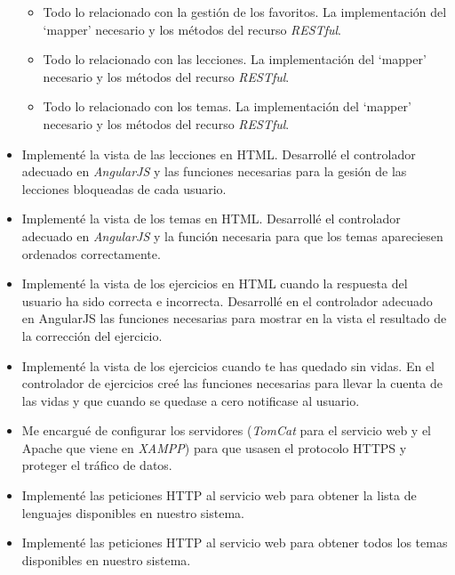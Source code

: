 \begin{itemize}
\begin{itemize}
\item
Todo lo relacionado con la gestión de los favoritos. La implementación del `mapper' necesario y los métodos del recurso \textit{RESTful}.

\item
Todo lo relacionado con las lecciones. La implementación del `mapper' necesario y los métodos del recurso \textit{RESTful}.

\item
Todo lo relacionado con los temas. La implementación del `mapper' necesario y los métodos del recurso \textit{RESTful}.
\end{itemize}
    
\item
Implementé la vista de las lecciones en HTML. Desarrollé el controlador adecuado en \textit{AngularJS} y las funciones necesarias para la gesión de las lecciones bloqueadas de cada usuario.

\item
Implementé la vista de los temas en HTML. Desarrollé el controlador adecuado en \textit{AngularJS} y la función necesaria para que los temas apareciesen ordenados correctamente.

\item
Implementé la vista de los ejercicios en HTML cuando la respuesta del usuario ha sido correcta e incorrecta. Desarrollé en el controlador adecuado en AngularJS las funciones necesarias para mostrar en la vista el resultado de la corrección del ejercicio.

\item
Implementé la vista de los ejercicios cuando te has quedado sin vidas. En el controlador de ejercicios creé las funciones necesarias para llevar la cuenta de las vidas y que cuando se quedase a cero notificase al usuario.

\item
Me encargué de configurar los servidores (\textit{TomCat} para el servicio web y el Apache que viene en \textit{XAMPP}) para que usasen el protocolo HTTPS y proteger el tráfico de datos.

\item
Implementé las peticiones HTTP al servicio web para obtener la lista de lenguajes disponibles en nuestro sistema.

\item
Implementé las peticiones HTTP al servicio web para obtener todos los temas disponibles en nuestro sistema.


\end{itemize}
